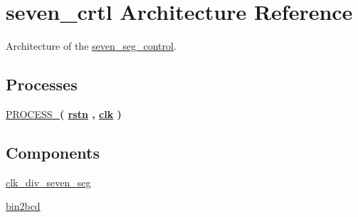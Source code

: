 \hypertarget{classseven__seg__control_1_1seven__crtl}{\section{seven\-\_\-crtl Architecture Reference}
\label{classseven__seg__control_1_1seven__crtl}
}


Architecture of the \hyperlink{classseven__seg__control}{seven\-\_\-seg\-\_\-control}.  


\subsection*{Processes}
 \begin{DoxyCompactItemize}
\item 
\hypertarget{classseven__seg__control_1_1seven__crtl_a284632d205b54f8f9124b30aee6b1887}{\hyperlink{classseven__seg__control_1_1seven__crtl_a284632d205b54f8f9124b30aee6b1887}{P\-R\-O\-C\-E\-S\-S\-\_}{\bfseries  ( {\bfseries {\bfseries \hyperlink{classseven__seg__control_aba021aec4b477b89079bb58ccadcc67e}{rstn}} \textcolor{vhdlchar}{ }\textcolor{vhdlchar}{ }\textcolor{vhdlchar}{ }} , {\bfseries {\bfseries \hyperlink{classseven__seg__control_a8120037e0ee47c35ba2d79242209c72e}{clk}} \textcolor{vhdlchar}{ }} )}}\label{classseven__seg__control_1_1seven__crtl_a284632d205b54f8f9124b30aee6b1887}

\end{DoxyCompactItemize}
\subsection*{Components}
 \begin{DoxyCompactItemize}
\item 
\hypertarget{classseven__seg__control_1_1seven__crtl_ac37f6407a40b9c2c6331c38048caf6f9}{\hyperlink{classseven__seg__control_1_1seven__crtl_ac37f6407a40b9c2c6331c38048caf6f9}{clk\-\_\-div\-\_\-seven\-\_\-seg}  {\bfseries }  }\label{classseven__seg__control_1_1seven__crtl_ac37f6407a40b9c2c6331c38048caf6f9}

\item 
\hypertarget{classseven__seg__control_1_1seven__crtl_aa2d5bf6e4dc6ef99dbc13d369781e56f}{\hyperlink{classseven__seg__control_1_1seven__crtl_aa2d5bf6e4dc6ef99dbc13d369781e56f}{bin2bcd}  {\bfseries }  }\label{classseven__seg__control_1_1seven__crtl_aa2d5bf6e4dc6ef99dbc13d369781e56f}

\end{DoxyCompactItemize}
